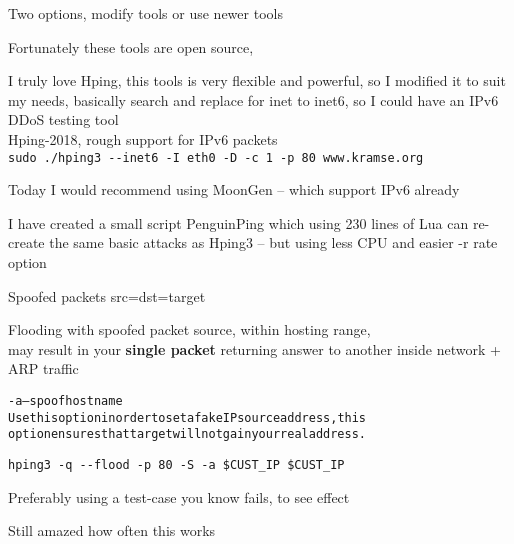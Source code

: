 \documentclass[Screen16to9,17pt]{foils}
\begin{document}
Two options, modify tools or use newer tools

\begin{list2}
\item Fortunately these tools are open source,

\item I truly love Hping, this tools is very flexible and powerful, so I modified it to suit my needs, basically search and replace for inet to inet6, so I could have an IPv6 DDoS testing tool\\
 Hping-2018, rough support for IPv6 packets\\
\verb+sudo ./hping3 --inet6 -I eth0 -D -c 1 -p 80 www.kramse.org+

\item Today I would recommend using MoonGen -- which support IPv6 already\\

\item I have created a small script PenguinPing which using 230 lines of Lua can re-create the same basic attacks as Hping3 -- but using less CPU and easier -r rate option\\

\end{list2}



Spoofed packets src=dst=target \smiley

Flooding with spoofed packet source, within hosting range, \\
may result in your {\bf single packet} returning answer to another inside network + ARP traffic

\begin{alltt}\small

-a --spoof hostname
    Use this option in order to set a fake IP  source  address,  this
    option ensures that target will not gain your real address.
\end{alltt}

\verb+hping3 -q --flood -p 80 -S -a $CUST_IP $CUST_IP+

Preferably using a test-case you know fails, to see effect

Still amazed how often this works



\end{document}
